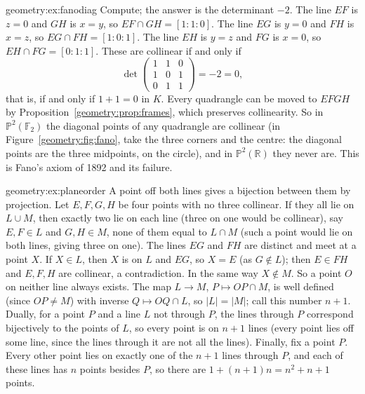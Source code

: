 \begin{solution}{geometry:ex:fanodiag}
\idea Compute; the answer is the determinant $-2$.
\writeup The line $EF$ is $z=0$ and $GH$ is $x=y$, so $EF\cap GH=[1:1:0]$. The line $EG$ is $y=0$ and $FH$ is $x=z$, so $EG\cap FH=[1:0:1]$.
The line $EH$ is $y=z$ and $FG$ is $x=0$, so $EH\cap FG=[0:1:1]$. These are collinear if and only if
\[
\det\begin{pmatrix}1&1&0\\1&0&1\\0&1&1\end{pmatrix}=-2=0,
\]
that is, if and only if $1+1=0$ in $K$. Every quadrangle can be moved to $EFGH$ by Proposition~\ref{geometry:prop:frames}, which preserves collinearity.
So in $\mathbb P^2(\mathbb F_2)$ the diagonal points of any quadrangle are collinear (in Figure~\ref{geometry:fig:fano}, take the three corners and the
centre: the diagonal points are the three midpoints, on the circle), and in $\mathbb P^2(\mathbb R)$ they never are. This is Fano's axiom of
1892 and its failure.
\end{solution}

\begin{solution}{geometry:ex:planeorder}
\idea A point off both lines gives a bijection between them by projection.
\writeup Let $E,F,G,H$ be four points with no three collinear. If they all lie on $L\cup M$, then exactly two lie on each line (three on one would be
collinear), say $E,F\in L$ and $G,H\in M$, none of them equal to $L\cap M$ (such a point would lie on both lines, giving three on one). The
lines $EG$ and $FH$ are distinct and meet at a point $X$. If $X\in L$, then $X$ is on $L$ and $EG$, so $X=E$ (as $G\notin L$); then $E\in FH$
and $E,F,H$ are collinear, a contradiction. In the same way $X\notin M$. So a point $O$ on neither line always exists. The map $L\to M$,
$P\mapsto OP\cap M$, is well defined (since $OP\ne M$) with inverse $Q\mapsto OQ\cap L$, so $|L|=|M|$; call this number $n+1$. Dually, for a
point $P$ and a line $L$ not through $P$, the lines through $P$ correspond bijectively to the points of $L$, so every point is on $n+1$ lines
(every point lies off some line, since the lines through it are not all the lines). Finally, fix a point $P$. Every other point lies on exactly
one of the $n+1$ lines through $P$, and each of these lines has $n$ points besides $P$, so there are $1+(n+1)n=n^2+n+1$ points.
\end{solution}

